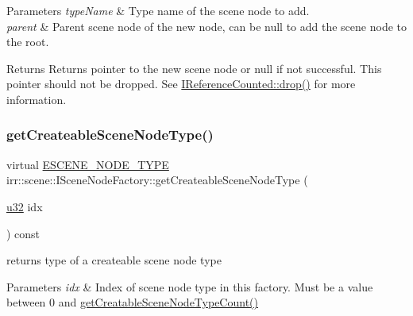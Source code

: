 \begin{DoxyParams}{Parameters}
{\em type\+Name} & Type name of the scene node to add. \\
\hline
{\em parent} & Parent scene node of the new node, can be null to add the scene node to the root. \\
\hline
\end{DoxyParams}
\begin{DoxyReturn}{Returns}
Returns pointer to the new scene node or null if not successful. This pointer should not be dropped. See \hyperlink{classirr_1_1IReferenceCounted_a03856a09355b89d178090c4a5f738543}{I\+Reference\+Counted\+::drop()} for more information. 
\end{DoxyReturn}
\mbox{\label{classirr_1_1scene_1_1ISceneNodeFactory_aaff4e3d3dc214ec83965ecbd8e8175a3}} 
\subsubsection{\texorpdfstring{get\+Createable\+Scene\+Node\+Type()}{getCreateableSceneNodeType()}\hspace{0.1cm}{\footnotesize\ttfamily [1/2]}}
{\footnotesize\ttfamily virtual \hyperlink{namespaceirr_1_1scene_acad3d7ef92a9807d391ba29120f3b7bd}{E\+S\+C\+E\+N\+E\+\_\+\+N\+O\+D\+E\+\_\+\+T\+Y\+PE} irr\+::scene\+::\+I\+Scene\+Node\+Factory\+::get\+Createable\+Scene\+Node\+Type (\begin{DoxyParamCaption}\item[{\hyperlink{namespaceirr_a0416a53257075833e7002efd0a18e804}{u32}}]{idx }\end{DoxyParamCaption}) const\hspace{0.3cm}{\ttfamily [pure virtual]}}



returns type of a createable scene node type 


\begin{DoxyParams}{Parameters}
{\em idx} & Index of scene node type in this factory. Must be a value between 0 and \hyperlink{classirr_1_1scene_1_1ISceneNodeFactory_a3c1be487fb0169ee9fbb7169c451d16e}{get\+Creatable\+Scene\+Node\+Type\+Count()} \\
\hline
\end{DoxyParams}
\mbox{\label{classirr_1_1scene_1_1ISceneNodeFactory_aaff4e3d3dc214ec83965ecbd8e8175a3}} 
